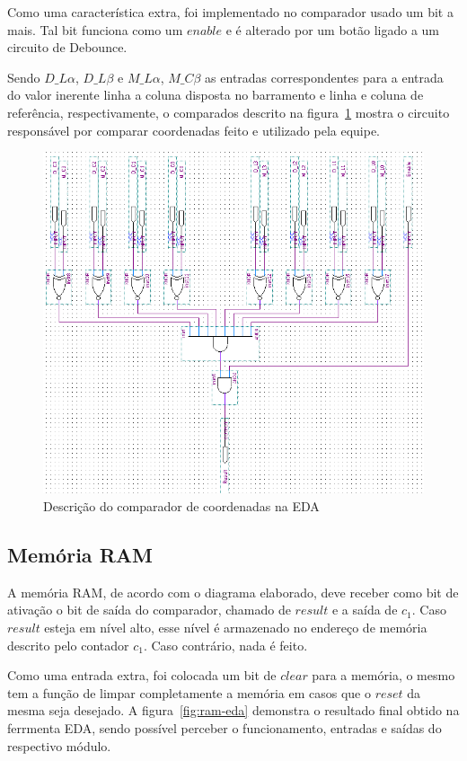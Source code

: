 \documentclass[12pt]{article}
\begin{document}
Como uma característica extra, foi implementado no comparador usado um bit a mais. Tal bit funciona como um $enable$ e é alterado por um botão ligado a um circuito de Debounce.

Sendo $D\_L\alpha$, $D\_L\beta$ e $M\_L\alpha$, $M\_C\beta$ as entradas correspondentes para a entrada do valor inerente linha a coluna disposta no barramento e linha e coluna de referência, respectivamente, o comparados descrito na figura~\ref{fig:comparador} mostra o circuito responsável por comparar coordenadas feito e utilizado pela equipe.

\begin{figure}[H]
\centering
\includegraphics[width=.8\textwidth]{img/comparador.png}
\caption{Descrição do comparador de coordenadas na EDA}
\label{fig:comparador}
\end{figure}


\subsection{Memória RAM}
A memória RAM, de acordo com o diagrama elaborado, deve receber como bit de ativação o bit de saída do comparador, chamado de $result$ e a saída de $c_{1}$. Caso $result$ esteja em nível alto, esse nível é armazenado no endereço de memória descrito pelo contador $c_{1}$. Caso contrário, nada é feito.

Como uma entrada extra, foi colocada um bit de $clear$ para a memória, o mesmo tem a função de limpar completamente a memória em casos que o $reset$ da mesma seja desejado. A figura~\ref{fig:ram-eda} demonstra o resultado final obtido na ferrmenta EDA, sendo possível perceber o funcionamento, entradas e saídas do respectivo módulo.
\end{document}
